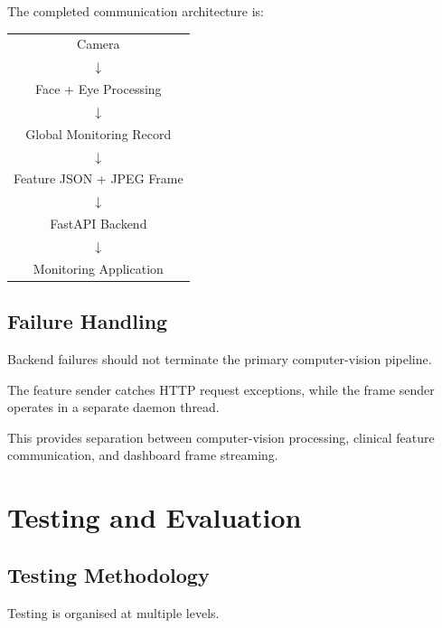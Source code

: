 \documentclass{tietreport}
\begin{document}
The completed communication architecture is:

\begin{center}

\begin{tabular}{c}

Camera\\
$\downarrow$\\
Face + Eye Processing\\
$\downarrow$\\
Global Monitoring Record\\
$\downarrow$\\
Feature JSON + JPEG Frame\\
$\downarrow$\\
FastAPI Backend\\
$\downarrow$\\
Monitoring Application

\end{tabular}

\end{center}


\section{Failure Handling}

Backend failures should not terminate the primary computer-vision
pipeline.

The feature sender catches HTTP request exceptions, while the frame
sender operates in a separate daemon thread.

This provides separation between computer-vision processing, clinical
feature communication, and dashboard frame streaming.


\chapter{Testing and Evaluation}

\section{Testing Methodology}

Testing is organised at multiple levels.
\end{document}
